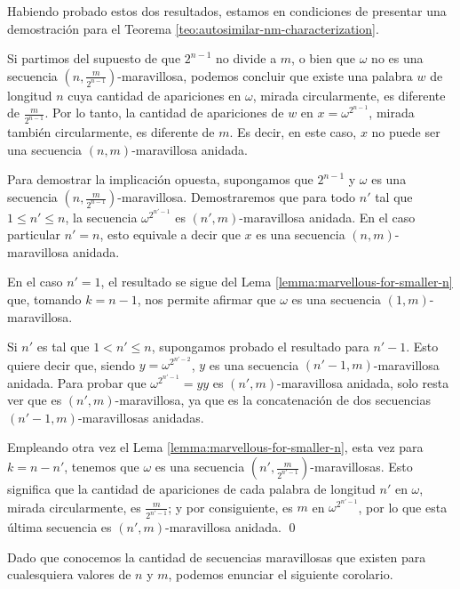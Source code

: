 \documentclass[11pt]{article}
\begin{document}
Habiendo probado estos dos resultados, estamos en condiciones de presentar una
demostración para el Teorema \ref{teo:autosimilar-nm-characterization}.

\begin{demo}
	Si partimos del supuesto de que $2^{n-1}$ no divide a $m$, o bien que
	$\omega$ no es una secuencia $\left( n, \frac{m}{2^{n-1}}
		\right)$-maravillosa,
	podemos concluir que existe una palabra $w$ de longitud $n$ cuya
	cantidad de
	apariciones en $\omega$, mirada circularmente, es diferente de
	$\frac{m}{2^{n-1}}$.
	Por lo tanto, la cantidad de apariciones de $w$ en $x = \omega^{2^{n-1}}$,
	mirada también circularmente, es diferente de $m$.
	Es decir, en este caso, $x$ no puede ser una secuencia $(n,m)$-maravillosa
	anidada.

	Para demostrar la implicación opuesta, supongamos que $2^{n-1}$ y $\omega$ es
	una secuencia $\left( n, \frac{m}{2^{n-1}} \right)$-maravillosa.
	Demostraremos que para todo $n'$ tal que $1 \leq n' \leq n$, la secuencia
	$\omega^{2^{n'-1}}$ es $(n',m)$-maravillosa anidada.
	En el caso particular $n' = n$, esto equivale a decir que $x$ es una secuencia
	$(n,m)$-maravillosa anidada.

	En el caso $n' = 1$, el resultado se sigue del Lema
	\ref{lemma:marvellous-for-smaller-n} que, tomando $k = n-1$, nos permite
	afirmar que $\omega$ es una secuencia $(1,m)$-maravillosa.

	Si $n'$ es tal que $1 < n' \leq n$, supongamos probado el resultado para
	$n'-1$.
	Esto quiere decir que, siendo $y = \omega^{2^{n' - 2}}$, $y$ es una secuencia
	$(n'-1, m)$-maravillosa anidada.
	Para probar que $\omega^{2^{n' - 1}} = yy$ es $(n',m)$-maravillosa anidada,
	solo resta ver que es $(n',m)$-maravillosa, ya que es la concatenación de dos
	secuencias $(n'-1, m)$-maravillosas anidadas.

	Empleando otra vez el Lema \ref{lemma:marvellous-for-smaller-n}, esta vez para
	$k = n - n'$, tenemos que $\omega$ es una secuencia $\left( n', \frac{m}{2^{n'
				- 1}} \right)$-maravillosas.
	Esto significa que la cantidad de apariciones de cada palabra de longitud $n'$
	en $\omega$, mirada circularmente, es $\frac{m}{2^{n' - 1}}$; y por
	consiguiente, es $m$ en $\omega^{2^{n'-1}}$, por lo que esta última secuencia
	es $(n',m)$-maravillosa anidada.
	\qed
\end{demo}

Dado que conocemos la cantidad de secuencias maravillosas que existen para
cualesquiera valores de $n$ y $m$, podemos enunciar el siguiente corolario.
\end{document}
